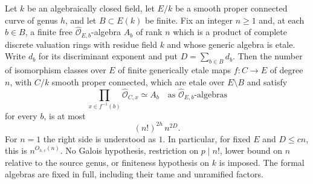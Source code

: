\begin{proposition}
\label{D:fixed-formal-curve-fibre-bound}
Let $k$ be an algebraically closed field, let $E/k$ be a smooth proper
connected curve of genus $h$, and let $B\subset E(k)$ be finite. Fix
an integer $n\ge1$ and, at each $b\in B$, a finite free
$\widehat{\mathcal O}_{E,b}$-algebra $A_b$ of rank $n$ which is a
product of complete discrete valuation rings with residue field $k$
and whose generic algebra is etale. Write $d_b$ for its discriminant
exponent and put $D=\sum_{b\in B}d_b$.
Then the number of isomorphism classes over $E$ of finite generically
etale maps $f:C\to E$ of degree $n$, with $C/k$ smooth proper connected, which
are etale over $E\setminus B$ and satisfy
\[
       \prod_{x\in f^{-1}(b)}\widehat{\mathcal O}_{C,x}
          \simeq A_b
       \quad\text{as }\widehat{\mathcal O}_{E,b}\text{-algebras}
                                                               \tag{D.FC.1}
\]
for every $b$, is at most
\[
                        (n!)^{2h}\,n^{2D}.             \tag{D.FC.2}
\]
For $n=1$ the right side is understood as $1$. In particular, for
fixed $E$ and $D\le cn$, this is $n^{O_{h,c}(n)}$.
No Galois hypothesis, restriction on $p\mid n!$, lower bound on $n$
relative to the source genus, or finiteness hypothesis on $k$ is imposed.
The formal algebras are fixed in full, including their tame and
unramified factors.
\end{proposition}
